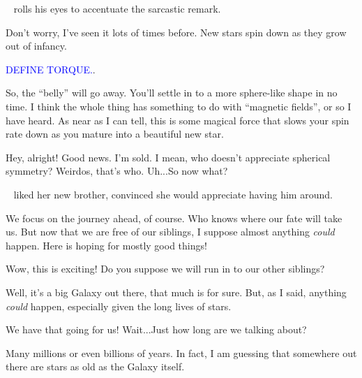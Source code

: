 \documentclass[main.tex]{subfiles}
\begin{document}
\par \nar \rmlacedaemon~ rolls his eyes to accentuate the sarcastic remark.

\par \Celaeno Don't worry, I've seen it lots of times before.  New stars spin down as they grow out of infancy.

\begin{tcolorbox}[sharp corners, colback=blue!30, colframe=blue!80!blue, title=Torque]
\par \textcolor{blue}{DEFINE TORQUE.}.  
\end{tcolorbox}


\par \Celaeno So, the ``belly'' will go away.  You'll settle in to a more sphere-like shape in no time.  I think the whole thing has something to do with ``magnetic fields'', or so I have heard.  As near as I can tell, this is some magical force that slows your spin rate down as you mature into a beautiful new star.

\par \Lacedaemon Hey, alright!  Good news.  I'm sold.  I mean, who doesn't appreciate spherical symmetry?  Weirdos, that's who.  Uh...So now what?

\par \nar \rmcelaeno~ liked her new brother, convinced she would appreciate having him around.

\par \Celaeno We focus on the journey ahead, of course.  Who knows where our fate will take us.  But now that we are free of our siblings, I suppose almost anything \textit{could} happen.  Here is hoping for mostly good things!

\par \Lacedaemon  Wow, this is exciting!  Do you suppose we will run in to our other siblings?

\par \Celaeno Well, it's a big Galaxy out there, that much is for sure.  But, as I said, anything \textit{could} happen, especially given the long lives of stars.  

\par \Lacedaemon We have that going for us!  Wait...Just how long are we talking about?

\par \Celaeno Many millions or even billions of years.  In fact, I am guessing that somewhere out there are stars as old as the Galaxy itself.
\end{document}

